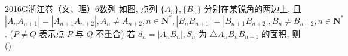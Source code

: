 
\begin{problem}{2016}{G}{浙江卷（文、理）}{6}{数列}
如图, 点列 $\{A_n\}, \{B_n\}$ 分别在某锐角的两边上, 且 $|A_nA_{n+1}|=|A_{n+1}A_{n+2}|, A_n \ne A_{n+2}, n \in \mathbf{N}^*, |B_nB_{n+1}|=|B_{n+1}B_{n+2}|, B_n \ne B_{n+2}, n \in \mathbf{N}^*$. ($P \ne Q$ 表示点 $P$ 与 $Q$ 不重合) 若 $d_n=|A_nB_n|, S_n$ 为 $\triangle A_nB_nB_{n+1}$ 的面积, 则 (\hspace{1cm})
\begin{choices}
\end{choices}
\end{problem}

